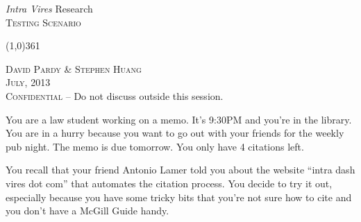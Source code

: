 \documentclass[11pt]{article}
\begin{document}
\setlength{\parindent}{1cm}

\frenchspacing
\vspace{-0.5in}

\begin{center}
\Huge
\emph{Intra Vires} Research\\
\Large
\textsc{Testing Scenario}
\end{center}
 \normalsize

\begin{center}
\vspace{-0.25in}
\line(1,0){361}


\normalsize
\textsc{David Pardy \& Stephen Huang}\\
\textsc{July, 2013}\\
\textsc{Confidential} -- Do not discuss outside this session.
\end{center}


You are a law student working on a memo. It's 9:30PM and you're in the library. You are in a hurry because you want to go out with your friends for the weekly pub night. The memo is due tomorrow. You only have 4 citations left.

You recall that your friend Antonio Lamer told you about the website ``intra dash vires dot com'' that automates the citation process. You decide to try it out, especially because you have some tricky bits that you're not sure how to cite and you don't have a McGill Guide handy.\\
\end{document}
